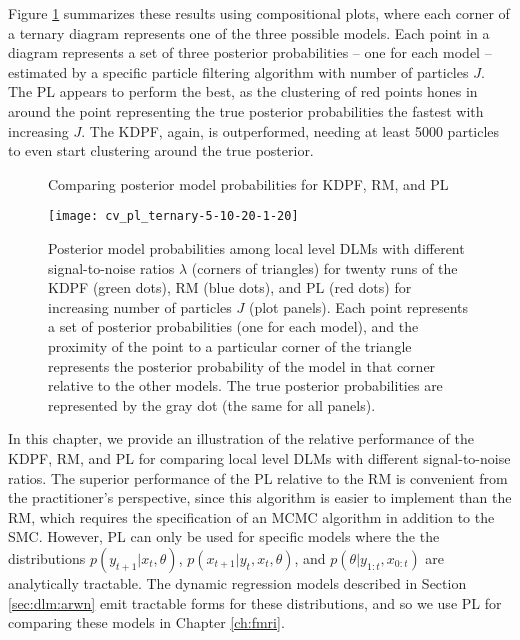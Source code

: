 Figure \ref{fig:comp:post} summarizes these results using compositional plots, where each corner of a ternary diagram represents one of the three possible models. Each point in a diagram represents a set of three posterior probabilities -- one for each model -- estimated by a specific particle filtering algorithm with number of particles $J$. The PL appears to perform the best, as the clustering of red points hones in around the point representing the true posterior probabilities the fastest with increasing $J$. The KDPF, again, is outperformed, needing at least 5000 particles to even start clustering around the true posterior.

\begin{figure}[ht]
\ssp
\centering
\caption{Comparing posterior model probabilities for KDPF, RM, and PL} \label{fig:comp:post}
\texttt{[image: cv\_pl\_ternary-5-10-20-1-20]}
\caption*{Posterior model probabilities among local level DLMs with different signal-to-noise ratios $\lambda$ (corners of triangles) for twenty runs of the KDPF (green dots), RM (blue dots), and PL (red dots) for increasing number of particles $J$ (plot panels). Each point represents a set of posterior probabilities (one for each model), and the proximity of the point to a particular corner of the triangle represents the posterior probability of the model in that corner relative to the other models. The true posterior probabilities are represented by the gray dot (the same for all panels).}
\end{figure}

In this chapter, we provide an illustration of the relative performance of the KDPF, RM, and PL for comparing local level DLMs with different signal-to-noise ratios. The superior performance of the PL relative to the RM is convenient from the practitioner's perspective, since this algorithm is easier to implement than the RM, which requires the specification of an MCMC algorithm in addition to the SMC. However, PL can only be used for specific models where the the distributions $p(y_{t+1}|x_t,\theta)$, $p(x_{t+1}|y_t,x_t,\theta)$, and $p(\theta|y_{1:t},x_{0:t})$ are analytically tractable. The dynamic regression models described in Section \ref{sec:dlm:arwn} emit tractable forms for these distributions, and so we use PL for comparing these models in Chapter \ref{ch:fmri}.